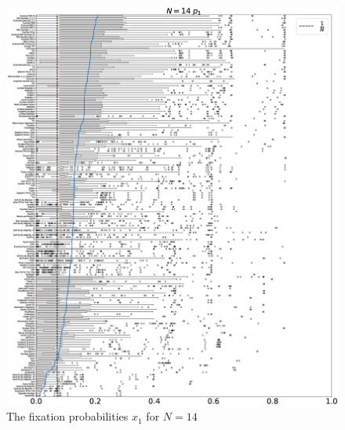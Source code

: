 \documentclass[10pt,letterpaper]{article}
\begin{document}
\begin{figure}[!hbtp]
    \centering
    \includegraphics[draft, width=\textwidth]{./Fig24.eps}
    \caption{The fixation probabilities \(x_1\) for \(N=14\)}
    \label{invasion-14}
\end{figure}
\end{document}
